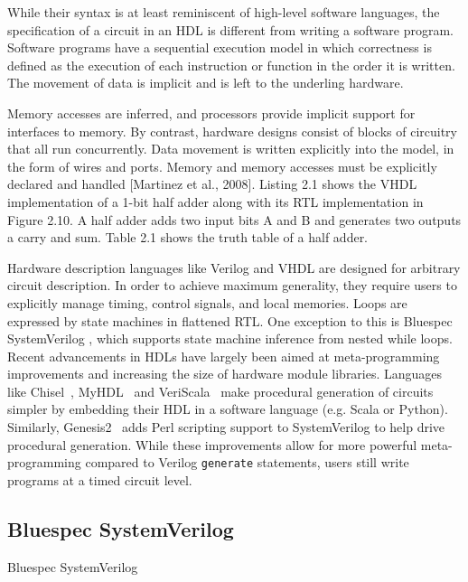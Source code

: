 While their syntax is at least reminiscent of high-level software languages, the specification of a circuit in an HDL is different from writing a software program. Software programs have a sequential execution model in which correctness is defined as the execution of each instruction or function in the order it is written.
The movement of data is implicit and is left to the underling hardware.

Memory accesses are inferred, and processors provide implicit support for interfaces to memory. By contrast, hardware designs consist of blocks of circuitry that all run concurrently. Data movement is written explicitly into the model, in the form of wires and ports. Memory and memory accesses must be explicitly declared and handled [Martinez et al., 2008]. Listing 2.1 shows the VHDL implementation of a 1-bit half adder along with its RTL implementation in Figure 2.10. A half adder adds two input bits A and B and generates two outputs a carry and sum. Table 2.1 shows the truth table of a half adder.


Hardware description languages like Verilog and VHDL are designed for arbitrary circuit description. In order to achieve maximum generality, they require users to explicitly manage timing, control signals, and local memories. Loops are expressed by state machines in flattened RTL.
One exception to this is Bluespec SystemVerilog \cite{bluespec}, which supports state machine inference from nested while loops.
Recent advancements in HDLs have largely been aimed at meta-programming improvements and increasing the size of hardware module libraries.
Languages like Chisel~\cite{chisel}, MyHDL~\cite{myhdl} and VeriScala~\cite{veriscala} make procedural generation of circuits simpler by embedding their HDL in a software language (e.g. Scala or Python). Similarly, Genesis2~\cite{genesis2} adds Perl scripting support to SystemVerilog to help drive procedural generation. While these improvements allow for more powerful meta-programming compared to Verilog \texttt{\small{generate}} statements, users still write programs at a timed circuit level.




%
\subsection{Bluespec SystemVerilog}
Bluespec SystemVerilog~\cite{bluespec}
% 

